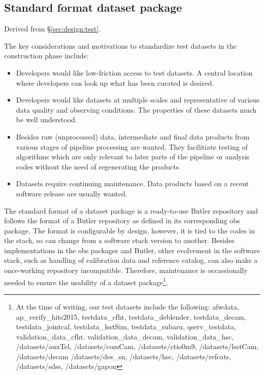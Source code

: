 \subsection{Standard format dataset package}
\label{sec:comp:dataset}

Derived from \S\ref{sec:design:test}.


The key considerations and motivations to standardize test datasets
in the construction phase include:

\begin{itemize}

\item{Developers would like low-friction access to test datasets.
A central location where developers can look up what has been curated
is desired.}

\item{Developers would like datasets at multiple scales and
representative of various data quality and observing conditions.
The properties of these datasets much be well understood.}

\item{Besides raw (unprocessed) data, intermediate and final data
products from various stages of pipeline processing are wanted.
They facilitiate testing of algorithms which are only relevant to
later parts of the pipeline or analysis codes without the need of
regenerating the products.}

\item{Datasets require continuing maintenance. Data products based
on a recent software release are usually wanted.}

\end{itemize}


The standard format of a dataset package is a ready-to-use Butler
repository and follows the format of a Butler repository as defined
in its corresponding obs package.  The format is configurable by
design, however, it is tied to the codes in the stack, so can change
from a software stack version to another.  Besides implementations
in the obs packages and Butler, other evolvement in the software
stack, such as handling of calibration data and reference catalog,
can also make a once-working repository incompatible.  Therefore,
maintenance is occassionally needed to ensure the usability of a
dataset package\footnote{At the time of writing, our test datasets include
the following: afwdata, ap\_verify\_hits2015, testdata\_cfht,
testdata\_deblender, testdata\_decam, testdata\_jointcal,
testdata\_lsstSim, testdata\_subaru, qserv\_testdata,
validation\_data\_cfht.  validation\_data\_decam, validation\_data\_hsc,
/datasets/auxTel, /datasets/comCam, /datasets/ctio0m9, /datasets/lsstCam,
/datasets/decam /datasets/des\_sn, /datasets/hsc, /datasets/refcats,
/datasets/sdss, /datasets/gapon}.

